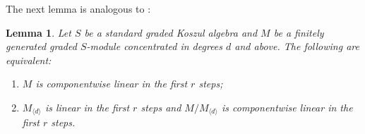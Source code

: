 \documentclass[a4paper,10pt]{amsart}
\newtheorem{lemma}[theorem]{Lemma}
\theoremstyle{definition}
\theoremstyle{remark}
\begin{document}
The next lemma is analogous to \cite[Lemma 5.5]{IR}:

\begin{lemma}\label{lem_linear_factor}
Let $S$ be a standard graded Koszul algebra and $M$ be a finitely generated graded $S$-module concentrated in degrees $d$ and above. The following are equivalent:
\begin{enumerate}[label={\normalfont(\alph*)}]
\item\label{linlem1} $M$ is componentwise linear in the first $r$ steps;
\item\label{linlem2} $M_{\langle d\rangle}$ is linear in the first $r$ steps and $M/M_{\langle d\rangle}$ is componentwise linear in the first $r$ steps.
\end{enumerate}
\end{lemma}
\end{document}
